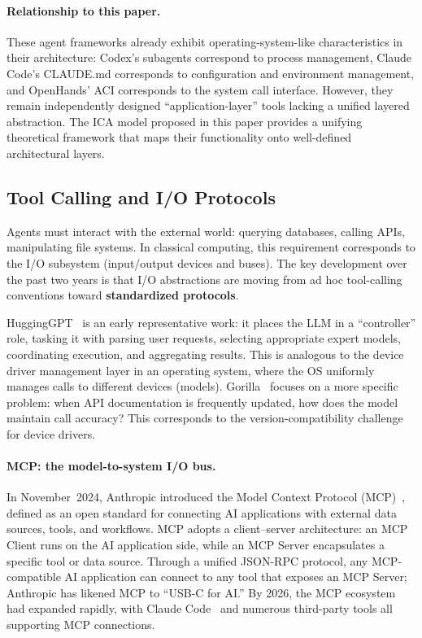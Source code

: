 \paragraph{Relationship to this paper.}
These agent frameworks already exhibit operating-system-like characteristics in their architecture: Codex's subagents correspond to process management, Claude Code's CLAUDE.md corresponds to configuration and environment management, and OpenHands' ACI corresponds to the system call interface.
However, they remain independently designed ``application-layer'' tools lacking a unified layered abstraction.
The ICA model proposed in this paper provides a unifying theoretical framework that maps their functionality onto well-defined architectural layers.

\subsection{Tool Calling and I/O Protocols}
\label{sec:related-io}

Agents must interact with the external world: querying databases, calling APIs, manipulating file systems.
In classical computing, this requirement corresponds to the I/O subsystem (input/output devices and buses).
The key development over the past two years is that I/O abstractions are moving from ad hoc tool-calling conventions toward \textbf{standardized protocols}.

HuggingGPT~\cite{hugginggpt2023} is an early representative work: it places the LLM in a ``controller'' role, tasking it with parsing user requests, selecting appropriate expert models, coordinating execution, and aggregating results.
This is analogous to the device driver management layer in an operating system, where the OS uniformly manages calls to different devices (models).
Gorilla~\cite{patil2024gorilla} focuses on a more specific problem: when API documentation is frequently updated, how does the model maintain call accuracy? This corresponds to the version-compatibility challenge for device drivers.

\paragraph{MCP: the model-to-system I/O bus.}
In November~2024, Anthropic introduced the Model Context Protocol (MCP)~\cite{mcp_intro_2026}, defined as an open standard for connecting AI applications with external data sources, tools, and workflows.
MCP adopts a client--server architecture: an MCP Client runs on the AI application side, while an MCP Server encapsulates a specific tool or data source.
Through a unified JSON-RPC protocol, any MCP-compatible AI application can connect to any tool that exposes an MCP Server; Anthropic has likened MCP to ``USB-C for AI.''
By 2026, the MCP ecosystem had expanded rapidly, with Claude Code~\cite{anthropic_claudecode_mcp_2026} and numerous third-party tools all supporting MCP connections.

